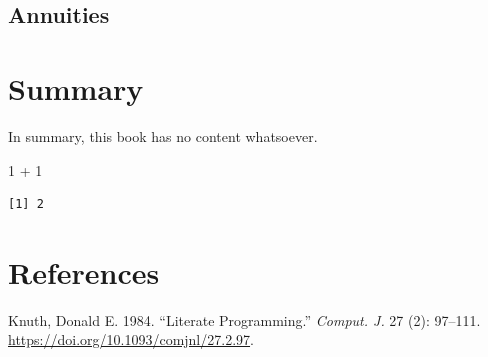 \documentclass[
  letterpaper,
  DIV=11,
  numbers=noendperiod]{scrreprt}
\newenvironment{Shaded}{\begin{snugshade}}{\end{snugshade}}
\newcommand{\DecValTok}[1]{\textcolor[rgb]{0.68,0.00,0.00}{#1}}
\newcommand{\SpecialCharTok}[1]{\textcolor[rgb]{0.37,0.37,0.37}{#1}}
\newlength{\cslhangindent}
\newlength{\cslentryspacingunit} %
\newenvironment{CSLReferences}[2] %
 {%
  \setlength{\parindent}{0pt}
  \ifodd #1
  \let\oldpar\par
  \def\par{\hangindent=\cslhangindent\oldpar}
  \fi
  \setlength{\parskip}{#2\cslentryspacingunit}
 }%
 {}
\begin{document}
\hypertarget{annuities}{%
\section{Annuities}\label{annuities}}


\hypertarget{summary}{%
\chapter{Summary}\label{summary}}

In summary, this book has no content whatsoever.

\begin{Shaded}
\begin{Highlighting}[]
\DecValTok{1} \SpecialCharTok{+} \DecValTok{1}
\end{Highlighting}
\end{Shaded}

\begin{verbatim}
[1] 2
\end{verbatim}


\hypertarget{references}{%
\chapter*{References}\label{references}}


\hypertarget{refs}{}
\begin{CSLReferences}{1}{0}
\leavevmode{}%
Knuth, Donald E. 1984. {``Literate Programming.''} \emph{Comput. J.} 27
(2): 97--111. \url{https://doi.org/10.1093/comjnl/27.2.97}.

\end{CSLReferences}
\end{document}
